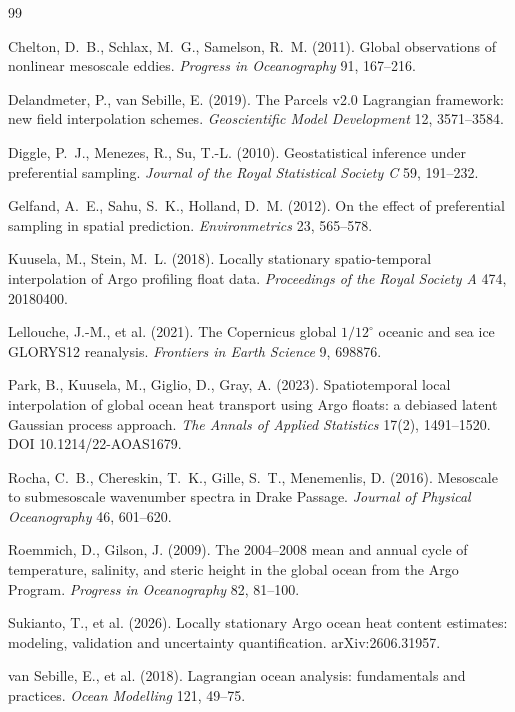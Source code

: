 \documentclass[11pt]{article}
\begin{document}
\begin{thebibliography}{99}

 Chelton, D.~B., Schlax, M.~G., Samelson, R.~M. (2011).
Global observations of nonlinear mesoscale eddies. \emph{Progress in Oceanography} 91, 167--216.

 Delandmeter, P., van Sebille, E. (2019).
The Parcels v2.0 Lagrangian framework: new field interpolation schemes.
\emph{Geoscientific Model Development} 12, 3571--3584.

 Diggle, P.~J., Menezes, R., Su, T.-L. (2010).
Geostatistical inference under preferential sampling.
\emph{Journal of the Royal Statistical Society C} 59, 191--232.

 Gelfand, A.~E., Sahu, S.~K., Holland, D.~M. (2012).
On the effect of preferential sampling in spatial prediction.
\emph{Environmetrics} 23, 565--578.

 Kuusela, M., Stein, M.~L. (2018).
Locally stationary spatio-temporal interpolation of Argo profiling float data.
\emph{Proceedings of the Royal Society A} 474, 20180400.

 Lellouche, J.-M., et al. (2021).
The Copernicus global $1/12^\circ$ oceanic and sea ice GLORYS12 reanalysis.
\emph{Frontiers in Earth Science} 9, 698876.

 Park, B., Kuusela, M., Giglio, D., Gray, A. (2023).
Spatiotemporal local interpolation of global ocean heat transport using Argo floats:
a debiased latent Gaussian process approach.
\emph{The Annals of Applied Statistics} 17(2), 1491--1520. DOI 10.1214/22-AOAS1679.

 Rocha, C.~B., Chereskin, T.~K., Gille, S.~T., Menemenlis, D. (2016).
Mesoscale to submesoscale wavenumber spectra in Drake Passage.
\emph{Journal of Physical Oceanography} 46, 601--620.

 Roemmich, D., Gilson, J. (2009).
The 2004--2008 mean and annual cycle of temperature, salinity, and steric height in the global
ocean from the Argo Program. \emph{Progress in Oceanography} 82, 81--100.

 Sukianto, T., et al. (2026).
Locally stationary Argo ocean heat content estimates: modeling, validation and uncertainty
quantification. arXiv:2606.31957.

 van Sebille, E., et al. (2018).
Lagrangian ocean analysis: fundamentals and practices. \emph{Ocean Modelling} 121, 49--75.

\end{thebibliography}
\end{document}
